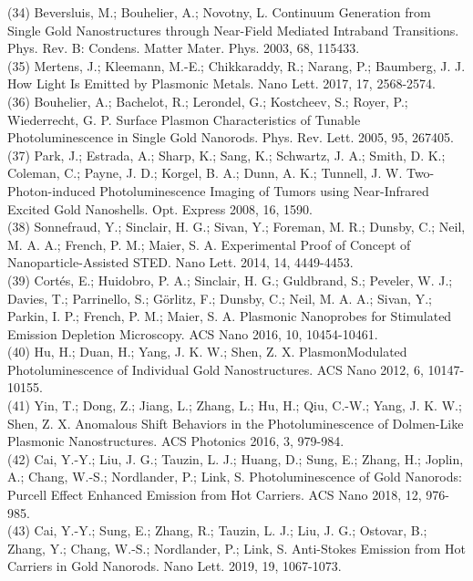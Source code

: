 \documentclass[10pt]{article}
\begin{document}
(34) Beversluis, M.; Bouhelier, A.; Novotny, L. Continuum Generation from Single Gold Nanostructures through Near-Field Mediated Intraband Transitions. Phys. Rev. B: Condens. Matter Mater. Phys. 2003, 68, 115433.\\
(35) Mertens, J.; Kleemann, M.-E.; Chikkaraddy, R.; Narang, P.; Baumberg, J. J. How Light Is Emitted by Plasmonic Metals. Nano Lett. 2017, 17, 2568-2574.\\
(36) Bouhelier, A.; Bachelot, R.; Lerondel, G.; Kostcheev, S.; Royer, P.; Wiederrecht, G. P. Surface Plasmon Characteristics of Tunable Photoluminescence in Single Gold Nanorods. Phys. Rev. Lett. 2005, 95, 267405.\\
(37) Park, J.; Estrada, A.; Sharp, K.; Sang, K.; Schwartz, J. A.; Smith, D. K.; Coleman, C.; Payne, J. D.; Korgel, B. A.; Dunn, A. K.; Tunnell, J. W. Two-Photon-induced Photoluminescence Imaging of Tumors using Near-Infrared Excited Gold Nanoshells. Opt. Express 2008, 16, 1590.\\
(38) Sonnefraud, Y.; Sinclair, H. G.; Sivan, Y.; Foreman, M. R.; Dunsby, C.; Neil, M. A. A.; French, P. M.; Maier, S. A. Experimental Proof of Concept of Nanoparticle-Assisted STED. Nano Lett. 2014, 14, 4449-4453.\\
(39) Cortés, E.; Huidobro, P. A.; Sinclair, H. G.; Guldbrand, S.; Peveler, W. J.; Davies, T.; Parrinello, S.; Görlitz, F.; Dunsby, C.; Neil, M. A. A.; Sivan, Y.; Parkin, I. P.; French, P. M.; Maier, S. A. Plasmonic Nanoprobes for Stimulated Emission Depletion Microscopy. ACS Nano 2016, 10, 10454-10461.\\
(40) Hu, H.; Duan, H.; Yang, J. K. W.; Shen, Z. X. PlasmonModulated Photoluminescence of Individual Gold Nanostructures. ACS Nano 2012, 6, 10147-10155.\\
(41) Yin, T.; Dong, Z.; Jiang, L.; Zhang, L.; Hu, H.; Qiu, C.-W.; Yang, J. K. W.; Shen, Z. X. Anomalous Shift Behaviors in the Photoluminescence of Dolmen-Like Plasmonic Nanostructures. ACS Photonics 2016, 3, 979-984.\\
(42) Cai, Y.-Y.; Liu, J. G.; Tauzin, L. J.; Huang, D.; Sung, E.; Zhang, H.; Joplin, A.; Chang, W.-S.; Nordlander, P.; Link, S. Photoluminescence of Gold Nanorods: Purcell Effect Enhanced Emission from Hot Carriers. ACS Nano 2018, 12, 976-985.\\
(43) Cai, Y.-Y.; Sung, E.; Zhang, R.; Tauzin, L. J.; Liu, J. G.; Ostovar, B.; Zhang, Y.; Chang, W.-S.; Nordlander, P.; Link, S. Anti-Stokes Emission from Hot Carriers in Gold Nanorods. Nano Lett. 2019, 19, 1067-1073.\\
\end{document}
